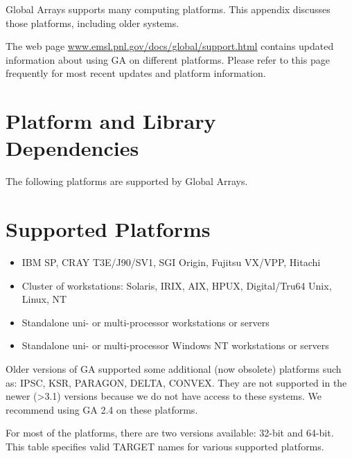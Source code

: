 \label{Appendix_C}Global Arrays supports many computing platforms.
This appendix discusses those platforms, including older systems.

The web page \url{www.emsl.pnl.gov/docs/global/support.html} contains
updated information about using GA on different platforms. Please
refer to this page frequently for most recent updates and platform
information. 


\section{Platform and Library Dependencies }

The following platforms are supported by Global Arrays. 


\section{Supported Platforms}
\begin{itemize}
\item IBM SP, CRAY T3E/J90/SV1, SGI Origin, Fujitsu VX/VPP, Hitachi 
\item Cluster of workstations: Solaris, IRIX, AIX, HPUX, Digital/Tru64 Unix,
Linux, NT 
\item Standalone uni- or multi-processor workstations or servers 
\item Standalone uni- or multi-processor Windows NT workstations or servers
\end{itemize}
Older versions of GA supported some additional (now obsolete) platforms
such as: IPSC, KSR, PARAGON, DELTA, CONVEX. They are not supported
in the newer (>3.1) versions because we do not have access to these
systems. We recommend using GA 2.4 on these platforms.

For most of the platforms, there are two versions available: 32-bit
and 64-bit. This table specifies valid TARGET names for various supported
platforms. 

